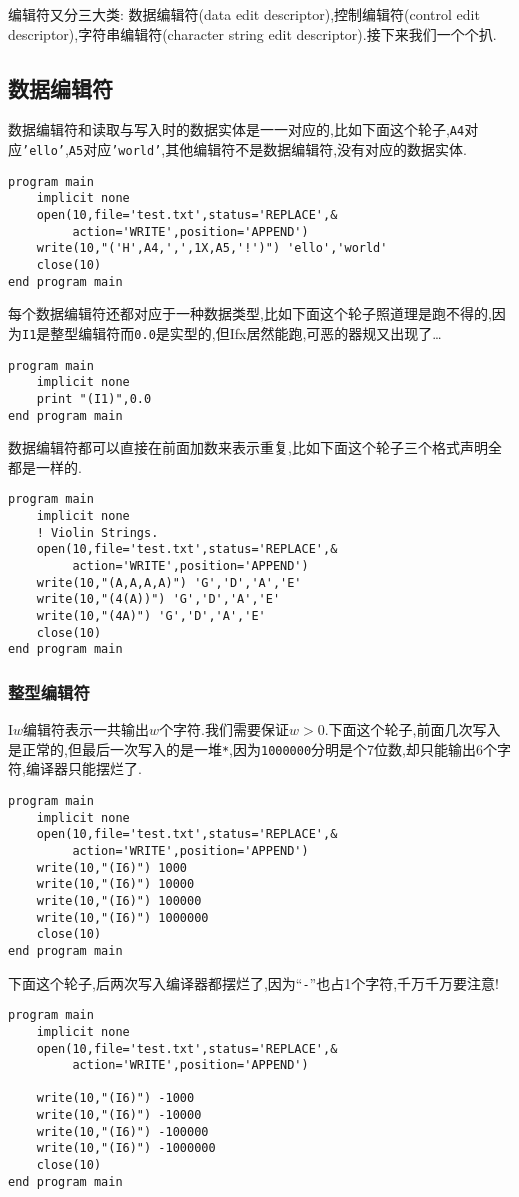 编辑符又分三大类: 数据编辑符(data edit descriptor),控制编辑符(control edit descriptor),字符串编辑符(character string edit descriptor).接下来我们一个个扒.

\subsection{数据编辑符}

数据编辑符和读取与写入时的数据实体是一一对应的,比如下面这个轮子,\texttt{A4}对应\texttt{'ello'},\texttt{A5}对应\texttt{'world'},其他编辑符不是数据编辑符,没有对应的数据实体.
\begin{lstlisting}
program main
    implicit none
    open(10,file='test.txt',status='REPLACE',&
         action='WRITE',position='APPEND')
    write(10,"('H',A4,',',1X,A5,'!')") 'ello','world'
    close(10)
end program main
\end{lstlisting}
每个数据编辑符还都对应于一种数据类型,比如下面这个轮子照道理是跑不得的,因为\texttt{I1}是整型编辑符而\texttt{0.0}是实型的,但Ifx居然能跑,可恶的器规又出现了\dots
\begin{lstlisting}
program main
    implicit none
    print "(I1)",0.0
end program main
\end{lstlisting}

数据编辑符都可以直接在前面加数来表示重复,比如下面这个轮子三个格式声明全都是一样的.
\begin{lstlisting}
program main
    implicit none
    ! Violin Strings.
    open(10,file='test.txt',status='REPLACE',&
         action='WRITE',position='APPEND')
    write(10,"(A,A,A,A)") 'G','D','A','E'
    write(10,"(4(A))") 'G','D','A','E'
    write(10,"(4A)") 'G','D','A','E'
    close(10)
end program main
\end{lstlisting}

\subsubsection{整型编辑符}

I$w$编辑符表示一共输出$w$个字符.我们需要保证$w>0$.下面这个轮子,前面几次写入是正常的,但最后一次写入的是一堆\texttt{*},因为\texttt{1000000}分明是个7位数,却只能输出6个字符,编译器只能摆烂了.
\begin{lstlisting}
program main
    implicit none
    open(10,file='test.txt',status='REPLACE',&
         action='WRITE',position='APPEND')
    write(10,"(I6)") 1000
    write(10,"(I6)") 10000
    write(10,"(I6)") 100000
    write(10,"(I6)") 1000000
    close(10)
end program main
\end{lstlisting}
下面这个轮子,后两次写入编译器都摆烂了,因为``\texttt{-}''也占1个字符,千万千万要注意!
\begin{lstlisting}
program main
    implicit none
    open(10,file='test.txt',status='REPLACE',&
         action='WRITE',position='APPEND')

    write(10,"(I6)") -1000
    write(10,"(I6)") -10000
    write(10,"(I6)") -100000
    write(10,"(I6)") -1000000
    close(10)
end program main
\end{lstlisting}

